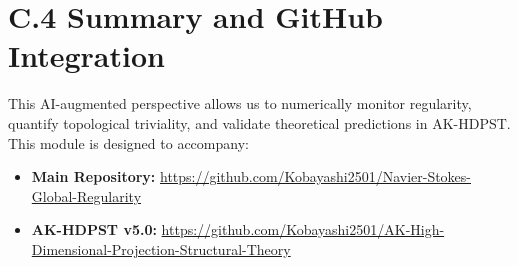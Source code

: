 \documentclass[11pt]{article}
\begin{document}
\section*{C.4 Summary and GitHub Integration}
This AI-augmented perspective allows us to numerically monitor regularity, quantify topological triviality, and validate theoretical predictions in AK-HDPST. This module is designed to accompany:
\begin{itemize}
  \item \textbf{Main Repository:} \url{https://github.com/Kobayashi2501/Navier-Stokes-Global-Regularity}
  \item \textbf{AK-HDPST v5.0:} \url{https://github.com/Kobayashi2501/AK-High-Dimensional-Projection-Structural-Theory}
\end{itemize}
\end{document}
